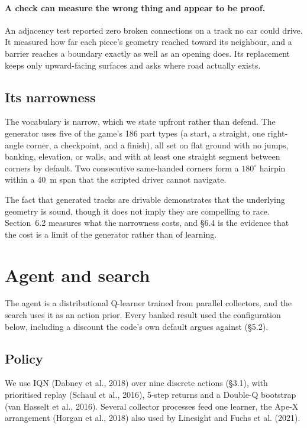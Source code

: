 \documentclass[11pt]{article}
\begin{document}
\paragraph{A check can measure the wrong thing and appear to be proof.} An adjacency test reported zero broken connections on a track no car could drive. It measured how far each piece's geometry reached toward its neighbour, and a barrier reaches a boundary exactly as well as an opening does. Its replacement keeps only upward-facing surfaces and asks where road actually exists.

\subsection{Its narrowness}

The vocabulary is narrow, which we state upfront rather than defend. The generator uses five of the game's 186 part types (a start, a straight, one right-angle corner, a checkpoint, and a finish), all set on flat ground with no jumps, banking, elevation, or walls, and with at least one straight segment between corners by default. Two consecutive same-handed corners form a $180^\circ$ hairpin within a 40~m span that the scripted driver cannot navigate.

The fact that generated tracks are drivable demonstrates that the underlying geometry is sound, though it does not imply they are compelling to race. Section~6.2 measures what the narrowness costs, and \S6.4 is the evidence that the cost is a limit of the generator rather than of learning.

\section{Agent and search}

The agent is a distributional Q-learner trained from parallel collectors, and the search uses it as an action prior. Every banked result used the configuration below, including a discount the code's own default argues against (\S5.2).

\subsection{Policy}

We use IQN (Dabney et al., 2018) over nine discrete actions (\S3.1), with prioritised replay (Schaul et al., 2016), 5-step returns and a Double-Q bootstrap (van Hasselt et al., 2016). Several collector processes feed one learner, the Ape-X arrangement (Horgan et al., 2018) also used by Linesight and Fuchs et al. (2021).
\end{document}
